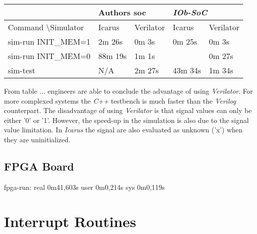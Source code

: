 \begin{table}[!ht]
    \centering
    \begin{tabular}{l|ll|ll|}
    \cline{2-5}
                                                           & \multicolumn{2}{l|}{Authors \acrshort{soc}} & \multicolumn{2}{l|}{\textit{IOb-SoC}}    \\ \hline
    \multicolumn{1}{|l|}{Command \textbackslash Simulator} & \multicolumn{1}{l|}{Icarus}  & Verilator & \multicolumn{1}{l|}{Icarus}  & Verilator \\ \hline
    \multicolumn{1}{|l|}{sim-run INIT\_MEM=1}              & \multicolumn{1}{l|}{2m 26s}  & 0m 3s     & \multicolumn{1}{l|}{0m 25s}  & 0m 3s     \\ \hline
    \multicolumn{1}{|l|}{sim-run INIT\_MEM=0}              & \multicolumn{1}{l|}{88m 19s} & 1m 1s     & \multicolumn{1}{l|}{}        & 0m 27s    \\ \hline
    \multicolumn{1}{|l|}{sim-test}                         & \multicolumn{1}{l|}{N/A}     & 2m 27s    & \multicolumn{1}{l|}{43m 34s} & 1m 34s    \\ \hline
    \end{tabular}
\end{table}

From table ... engineers are able to conclude the advantage of using \textit{Verilator}. For more complexed systems the \textit{C++} testbench is much faster than the \textit{Verilog} counterpart. The disadvantage of using \textit{Verilator} is that signal values can only be either '0' or '1'. However, the speed-up in the simulation is also due to the signal value limitation. In \textit{Icarus} the signal are also evaluated as unknown ('x') when they are uninitialized.

\subsection{FPGA Board}

fpga-run: 
real	0m41,603s
user	0m0,214s
sys	0m0,119s


\section{Interrupt Routines}

